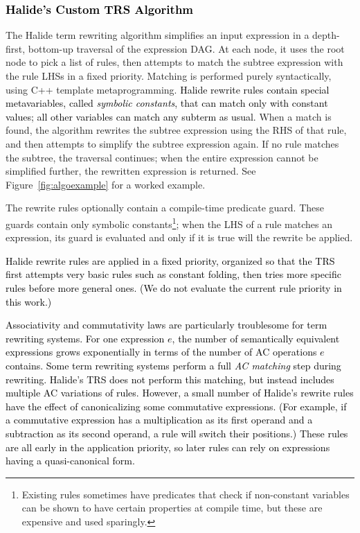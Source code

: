 \documentclass[acmsmall]{acmart}\settopmatter{}
\newcommand{\modified}[1]{\textcolor{black}{{#1}}}
\begin{document}
\subsubsection{\modified{Halide's Custom TRS Algorithm}}
\label{sec:customalgo}
The Halide term rewriting algorithm simplifies an input expression in a
depth-first, bottom-up traversal of the expression DAG. At each node, it 
uses the root node to pick a list of rules, then
attempts to match the subtree expression with the rule LHSs in a fixed priority. Matching
is performed purely syntactically, using C++ template metaprogramming.
 \modified{Halide rewrite rules contain special metavariables,
called \emph{symbolic constants}, that can match only with constant values; all other
variables can match any subterm as usual.}
When a match is found, the algorithm rewrites the
subtree expression using the RHS of that rule, and then attempts to simplify the
subtree expression again. If no rule matches the subtree, the traversal
continues; when the entire expression cannot be simplified further, the
rewritten expression is returned. See Figure~\ref{fig:algoexample} for a worked
example.

The rewrite rules optionally contain a compile-time predicate guard. 
These guards contain only symbolic constants\footnote{Existing 
rules sometimes have predicates that check if
  non-constant variables can be shown to have certain properties at compile
  time, but these are expensive and used sparingly.}; when the LHS of a rule
matches an expression, its guard is evaluated and only if it
is true will the rewrite be applied.

\modified{Halide rewrite rules are applied in a fixed priority, organized so that the TRS 
first attempts very basic rules such as constant folding, then tries more specific 
rules before more general ones. (We do not evaluate the current rule priority in this work.)}

\modified{Associativity and commutativity laws are particularly troublesome for term rewriting systems. 
For one expression $e$, the number of semantically equivalent expressions grows 
exponentially in terms of the number of AC operations $e$ contains. Some term rewriting 
systems perform a full \emph{AC matching} step during rewriting. Halide's TRS does not
perform this matching, but instead
includes multiple AC variations of rules.
However, a small number of Halide's rewrite rules have the effect of canonicalizing some commutative
expressions. (For example, if a commutative expression has a multiplication as its 
first operand and a subtraction as its second operand, a rule will switch their positions.)
These rules are all early in the application priority, so later rules can rely on
expressions having a quasi-canonical form.}
\end{document}
